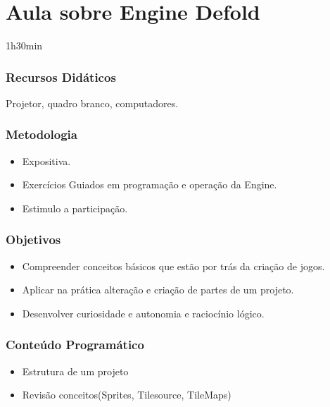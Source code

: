\documentclass[letterpaper,10pt,brazil]{sphinxmanual}
\begin{document}
\section{Aula sobre Engine Defold}
\label{\detokenize{modelo_aula_02:aula-sobre-engine-defold}}
\sphinxAtStartPar
{} 1h30min
\subsubsection*{Recursos Didáticos}

\sphinxAtStartPar
Projetor, quadro branco, computadores.
\subsubsection*{Metodologia}
\begin{itemize}
\item {} 
\sphinxAtStartPar
Expositiva.

\item {} 
\sphinxAtStartPar
Exercícios Guiados em programação e operação da Engine.

\item {} 
\sphinxAtStartPar
Estimulo a participação.

\end{itemize}
\subsubsection*{Objetivos}
\begin{itemize}
\item {} 
\sphinxAtStartPar
Compreender conceitos básicos que estão por trás da criação de jogos.

\item {} 
\sphinxAtStartPar
Aplicar na prática alteração e criação de partes de um projeto.

\item {} 
\sphinxAtStartPar
Desenvolver curiosidade e autonomia e raciocínio lógico.

\end{itemize}
\subsubsection*{Conteúdo Programático}

\sphinxAtStartPar
{}
\begin{itemize}
\item {} 
\sphinxAtStartPar
Estrutura de um projeto

\item {} 
\sphinxAtStartPar
Revisão conceitos(Sprites, Tilesource, TileMaps)

\end{itemize}
\end{document}
